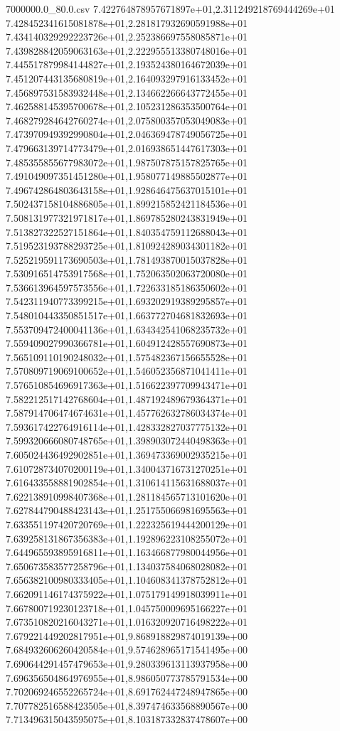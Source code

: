 \begin{filecontents*}{7000000.0_80.0.csv}
7.422764878957671897e+01,2.311249218769444269e+01
7.428452341615081878e+01,2.281817932690591988e+01
7.434140329292223726e+01,2.252386697558085871e+01
7.439828842059063163e+01,2.222955513380748016e+01
7.445517879984144827e+01,2.193524380164672039e+01
7.451207443135680819e+01,2.164093297916133452e+01
7.456897531583932448e+01,2.134662266643772455e+01
7.462588145395700678e+01,2.105231286353500764e+01
7.468279284642760274e+01,2.075800357053049083e+01
7.473970949392990804e+01,2.046369478749056725e+01
7.479663139714773479e+01,2.016938651447617303e+01
7.485355855677983072e+01,1.987507875157825765e+01
7.491049097351451280e+01,1.958077149885502877e+01
7.496742864803643158e+01,1.928646475637015101e+01
7.502437158104886805e+01,1.899215852421184536e+01
7.508131977321971817e+01,1.869785280243831949e+01
7.513827322527151864e+01,1.840354759112688043e+01
7.519523193788293725e+01,1.810924289034301182e+01
7.525219591173690503e+01,1.781493870015037828e+01
7.530916514753917568e+01,1.752063502063720080e+01
7.536613964597573556e+01,1.722633185186350602e+01
7.542311940773399215e+01,1.693202919389295857e+01
7.548010443350851517e+01,1.663772704681832693e+01
7.553709472400041136e+01,1.634342541068235732e+01
7.559409027990366781e+01,1.604912428557690873e+01
7.565109110190248032e+01,1.575482367156655528e+01
7.570809719069100652e+01,1.546052356871041411e+01
7.576510854696917363e+01,1.516622397709943471e+01
7.582212517142768604e+01,1.487192489679364371e+01
7.587914706474674631e+01,1.457762632786034374e+01
7.593617422764916114e+01,1.428332827037775132e+01
7.599320666080748765e+01,1.398903072440498363e+01
7.605024436492902851e+01,1.369473369002935215e+01
7.610728734070200119e+01,1.340043716731270251e+01
7.616433558881902854e+01,1.310614115631688037e+01
7.622138910998407368e+01,1.281184565713101620e+01
7.627844790488423143e+01,1.251755066981695563e+01
7.633551197420720769e+01,1.222325619444200129e+01
7.639258131867356383e+01,1.192896223108255072e+01
7.644965593895916811e+01,1.163466877980044956e+01
7.650673583577258796e+01,1.134037584068028082e+01
7.656382100980333405e+01,1.104608341378752812e+01
7.662091146174375922e+01,1.075179149918039911e+01
7.667800719230123718e+01,1.045750009695166227e+01
7.673510820216043271e+01,1.016320920716498222e+01
7.679221449202817951e+01,9.868918829874019139e+00
7.684932606260420584e+01,9.574628965171541495e+00
7.690644291457479653e+01,9.280339613113937958e+00
7.696356504864976955e+01,8.986050773785791534e+00
7.702069246552265724e+01,8.691762447248947865e+00
7.707782516588423505e+01,8.397474633568890567e+00
7.713496315043595075e+01,8.103187332837478607e+00

\end{filecontents*}
